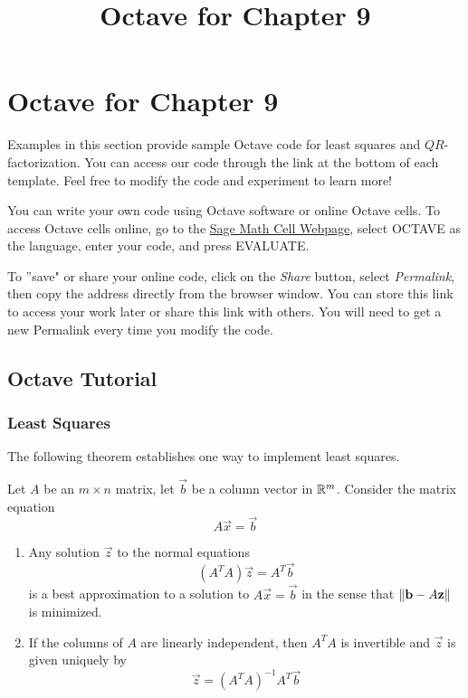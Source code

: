 \documentclass{ximera}
\title{Octave for Chapter 9} \license{CC BY-NC-SA 4.0}
\begin{document}
\begin{abstract}
\end{abstract}
\maketitle

\section*{Octave for Chapter 9}

Examples in this section provide sample Octave code for least squares and $QR$-factorization. You can access our code through the link at the bottom of each template.  Feel free to modify the code and experiment to learn more!  

You can write your own code using Octave software or online Octave cells.  To access Octave cells online, go to the \href{https://sagecell.sagemath.org/}{Sage Math Cell Webpage}, select OCTAVE as the language, enter your code, and press EVALUATE.  

To ''save" or share your online code, click on the \emph{Share} button, select \emph{Permalink}, then copy the address directly from the browser window.  You can store this link to access your work later or share this link with others.  You will need to get a new Permalink every time you modify the code.

\subsection*{Octave Tutorial}
\subsubsection*{Least Squares}
The following theorem establishes one way to implement least squares.

\begin{theorem}[\ref{th:bestApprox}]
    Let $A$ be an $m\times n$ matrix, let $\vec{b}$ be a column vector in $\mathbb{R}^m$.  Consider the matrix equation
    $$A\vec{x}=\vec{b}$$
    \begin{enumerate}
        \item Any solution $\vec{z}$ to the normal equations
        $$\left(A^TA\right)\vec{z}=A^T\vec{b}$$
        is a best approximation to a solution to $A\vec{x}=\vec{b}$ in the sense that $\left\lVert\mathbf{b}-A\mathbf{z}\right\rVert$ is minimized.
        \item If the columns of $A$ are linearly independent, then $A^TA$ is invertible and $\vec{z}$ is given uniquely by
        $$\vec{z}=\left(A^TA\right)^{-1}A^T\vec{b}$$
    \end{enumerate}
    \end{theorem}
\end{document}
